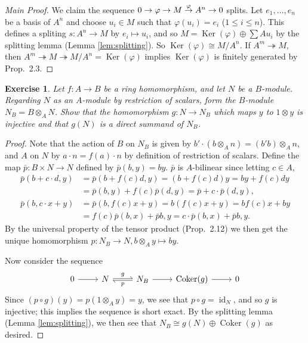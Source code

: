 \documentclass[12pt,letterpaper]{article}
\newtheorem{problem}{Exercise}[section]
\theoremstyle{definition}
\theoremstyle{remark}
\numberwithin{figure}{problem}
\numberwithin{equation}{section}
\let\ker\relax
\DeclareMathOperator{\ker}{Ker}
\DeclareMathOperator{\Ker}{Ker}
\DeclareMathOperator{\Coker}{Coker}
\DeclareMathOperator{\id}{id}
\begin{document}
\begin{proof}[Main Proof]
  We claim the sequence $0 \to \ker\varphi \to M \overset{\varphi}{\to} A^n \to 0$ splits. Let $e_1,\ldots,e_n$ be a basis of $A^n$ and choose $u_i \in M$ such that $\varphi(u_i) = e_i$ ($1 \le i \le n$). This defines a spliting $s\colon A^n \to M$ by $e_i \mapsto u_i$, and so $M = \Ker(\varphi) \oplus \sum Au_i$ by the splitting lemma (Lemma \ref{lem:splitting}). So $\Ker(\varphi) \cong M/A^n$. If $A^m \twoheadrightarrow M$, then $A^m \twoheadrightarrow M \twoheadrightarrow M/A^n = \Ker(\varphi)$ implies $\Ker(\varphi)$ is finitely generated by Prop.~2.3.
\end{proof}

\begin{problem}
  Let $f\colon A \to B$ be a ring homomorphism, and let $N$ be a $B$-module. Regarding $N$ as an $A$-module by restriction of scalars, form the $B$-module $N_B = B \otimes_A N$. Show that the homomorphism $g\colon N \to N_B$ which maps $y$ to $1 \otimes y$ is injective and that $g(N)$ is a direct summand of $N_B$.
\end{problem}
\begin{proof}
  Note that the action of $B$ on $N_B$ is given by $b' \cdot (b \otimes_A n) = (b'b) \otimes_A n$, and $A$ on $N$ by $a \cdot n = f(a) \cdot n$ by definition of restriction of scalars. Define the map $\bar{p}\colon B \times N \to N$ defined by $\bar{p}(b,y) = by$. $\bar{p}$ is $A$-bilinear since letting $c \in A$,
  \begin{align*}
    \bar{p}(b+c \cdot d,y) &= \bar{p}(b+f(c)d,y) = (b + f(c)d)y = by + f(c)dy\\
    &= \bar{p}(b,y) + f(c)\bar{p}(d,y) = \bar{p} + c \cdot \bar{p}(d,y),\\
    \bar{p}(b,c \cdot x+y) &= \bar{p}(b,f(c)x + y) = b(f(c)x+y) = bf(c)x + by\\
    &= f(c)\bar{p}(b,x) + \bar{p}{b,y} = c \cdot \bar{p}(b,x) + \bar{p}{b,y}.
  \end{align*}
  By the universal property of the tensor product (Prop.~2.12) we then get the unique homomorphism $p\colon N_B \to N, b\otimes_A y \mapsto by$.
  \par Now consider the sequence
  \begin{equation*}
    \begin{tikzcd}
      0 \rar & N \rar[rightharpoonup,yshift=0.25ex]{g} & \lar[rightharpoonup,yshift=-0.25ex]{p} N_B \rar & \Coker(g) \rar & 0
    \end{tikzcd}
  \end{equation*}
  Since $(p \circ g)(y) = p(1 \otimes_A y) = y$, we see that $p \circ g = \id_N$, and so $g$ is injective; this implies the sequence is short exact. By the splitting lemma (Lemma \ref{lem:splitting}), we then see that $N_B \cong g(N) \oplus \Coker(g)$ as desired.
\end{proof}
\end{document}
